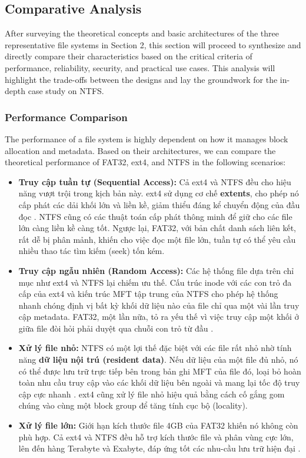 \documentclass[12pt]{article}
\begin{document}
\subsection{Comparative Analysis}
After surveying the theoretical concepts and basic architectures of the three representative file systems in Section 2, this section will proceed to synthesize and directly compare their characteristics based on the critical criteria of performance, reliability, security, and practical use cases. This analysis will highlight the trade-offs between the designs and lay the groundwork for the in-depth case study on NTFS.

\subsubsection{Performance Comparison}
The performance of a file system is highly dependent on how it manages block allocation and metadata. Based on their architectures, we can compare the theoretical performance of FAT32, ext4, and NTFS in the following scenarios:

\begin{itemize}
    \item \textbf{Truy cập tuần tự (Sequential Access):} Cả ext4 và NTFS đều cho hiệu năng vượt trội trong kịch bản này. ext4 sử dụng cơ chế \textbf{extents}, cho phép nó cấp phát các dải khối lớn và liền kề, giảm thiểu đáng kể chuyển động của đầu đọc \parencite{Dhjaku2019}. NTFS cũng có các thuật toán cấp phát thông minh để giữ cho các file lớn càng liền kề càng tốt. Ngược lại, FAT32, với bản chất danh sách liên kết, rất dễ bị phân mảnh, khiến cho việc đọc một file lớn, tuần tự có thể yêu cầu nhiều thao tác tìm kiếm (seek) tốn kém.

    \item \textbf{Truy cập ngẫu nhiên (Random Access):} Các hệ thống file dựa trên chỉ mục như ext4 và NTFS lại chiếm ưu thế. Cấu trúc inode với các con trỏ đa cấp của ext4 và kiến trúc MFT tập trung của NTFS cho phép hệ thống nhanh chóng định vị bất kỳ khối dữ liệu nào của file chỉ qua một vài lần truy cập metadata. FAT32, một lần nữa, tỏ ra yếu thế vì việc truy cập một khối ở giữa file đòi hỏi phải duyệt qua chuỗi con trỏ từ đầu \parencite{Silberschatz2018}.

    \item \textbf{Xử lý file nhỏ:} NTFS có một lợi thế đặc biệt với các file rất nhỏ nhờ tính năng \textbf{dữ liệu nội trú (resident data)}. Nếu dữ liệu của một file đủ nhỏ, nó có thể được lưu trữ trực tiếp bên trong bản ghi MFT của file đó, loại bỏ hoàn toàn nhu cầu truy cập vào các khối dữ liệu bên ngoài và mang lại tốc độ truy cập cực nhanh \parencite{Tanenbaum2014}. ext4 cũng xử lý file nhỏ hiệu quả bằng cách cố gắng gom chúng vào cùng một block group để tăng tính cục bộ (locality).

    \item \textbf{Xử lý file lớn:} Giới hạn kích thước file 4GB của FAT32 khiến nó không còn phù hợp. Cả ext4 và NTFS đều hỗ trợ kích thước file và phân vùng cực lớn, lên đến hàng Terabyte và Exabyte, đáp ứng tốt các nhu-cầu lưu trữ hiện đại \parencite{Dhjaku2019}.
\end{itemize}
\end{document}
